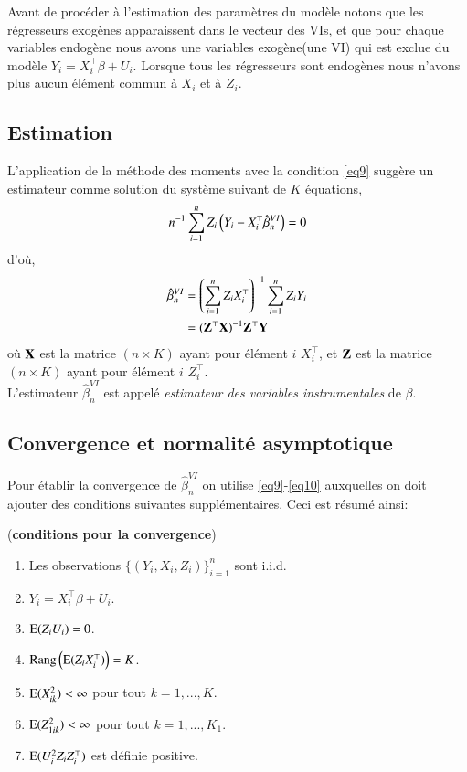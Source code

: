 \documentclass[10pt, reqno]{amsart}
\begin{document}
Avant de procéder à l'estimation des paramètres du modèle notons que les régresseurs exogènes 
apparaissent dans le vecteur des VIs, 
et que pour chaque variables endogène nous avons une variables exogène(une VI) qui est 
 exclue du modèle $Y_i = X_i^\top\beta +U_i$. Lorsque tous les régresseurs sont endogènes 
 nous n'avons plus aucun élément commun à $X_i$ et à $Z_i$. 

 \subsection{Estimation}
L'application de la méthode des moments avec la condition \eqref{eq9} suggère un estimateur comme 
solution du système suivant de $K$ équations,
\begin{align*}
n^{-1}\sum_{i=1}^n Z_i\left(Y_i-X_i^\top\hat{\beta}^{VI}_n\right) = 0
\end{align*}
d'où,
\begin{align*}
\hat{\beta}^{VI}_n &= \left(\sum_{i=1}^n Z_iX_i^\top\right)^{-1}\sum_{i=1}^n Z_iY_i\\
&=(\mathbf Z^\top\mathbf X)^{-1}\mathbf Z^\top\mathbf Y
\end{align*}
où $\mathbf X$ est la matrice $(n\times K)$ ayant pour élément $i$ $X_i^\top$, et $\mathbf Z$ est la matrice $(n\times K)$ ayant pour élément $i$ $Z_i^\top$.\\
L'estimateur $\hat{\beta}^{VI}_n$ est appelé \emph{estimateur des variables instrumentales} de $\beta$.

\subsection{Convergence et normalité asymptotique}

Pour établir la convergence de $\hat{\beta}^{VI}_n$ on utilise \eqref{eq9}-\eqref{eq10} auxquelles on doit 
ajouter des conditions suivantes supplémentaires. Ceci est résumé ainsi:
\begin{condition}(\textbf{conditions pour la convergence})
\begin{enumerate}[label = (C1.\arabic*)]
\item Les observations $\{(Y_i, X_i, Z_i)\}_{i=1}^n$ sont i.i.d.
\item $Y_i = X_i^\top\beta + U_i$.
\item $\operatorname{E}(Z_iU_i) = 0$.
\item $\mathrm{Rang}\left(\operatorname{E}(Z_iX_i^\top)\right) = K$.
\item $\operatorname{E}(X_{ik}^2) < \infty$ pour tout $k=1,...,K$.
\item $\operatorname{E}(Z_{1ik}^2) < \infty$ pour tout $k=1,...,K_1$.
\item $\operatorname{E}(U_i^2Z_iZ_i^\top)$ est définie positive.
\end{enumerate}
\label{cond1}
\end{condition}
\end{document}
